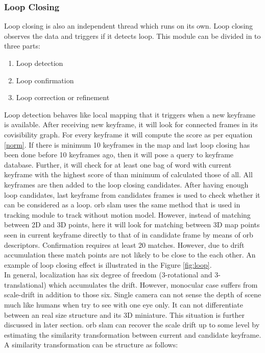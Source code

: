 \subsubsection{Loop Closing} 
Loop closing is also an independent thread which runs on its own. Loop closing observes the data and triggers if it detects loop. This module can be divided in to three parts:
\begin{enumerate}
	\item Loop detection
	\item Loop confirmation
	\item Loop correction or refinement
\end{enumerate}
Loop detection behaves like local mapping that it triggers when a new keyframe is available. After receiving new keyframe, it will look for connected frames in its covisibility graph. For every keyframe it will compute the score as per equation \ref{norm}. If there is minimum 10 keyframes in the map and last loop closing has been done before 10 keyframes ago, then it will pose a query to keyframe database. Further, it will check for at least one bag of word with current keyframe with the highest score of than minimum of calculated those of all. All keyframes are then added to the loop closing candidates.
\newline
After having enough loop candidates, last keyframe from candidates frames is used to check whether it can be considered as a loop. \acrshort{orb} \acrshort{slam} uses the same method that is used in tracking module to track without motion model. However, instead of matching between 2D and 3D points, here it will look for matching between 3D map points seen in current keyframe directly to that of in candidate frame by means of \acrshort{orb} descriptors. Confirmation requires at least 20 matches. However, due to drift accumulation these match points are not likely to be close to the each other. An example of loop closing effect is illustrated in the Figure \ref{fig:loop}.\\
\newline In general, localization has six degree of freedom (3-rotational and 3-translational) which accumulates the drift. However, monocular case suffers from scale-drift in addition to those six. Single camera can not sense the depth of scene much like humans when try to see with one eye only. It can not differentiate between an real size structure and its 3D miniature. This situation is further discussed in later section. \acrshort{orb} \acrshort{slam} can recover the scale drift up to some level by estimating the similarity transformation between current and candidate keyframe. A similarity transformation can be structure as follows:
